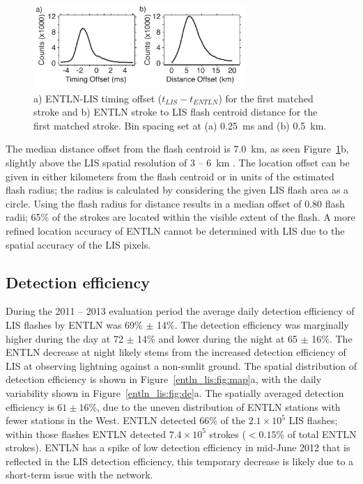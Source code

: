 \begin{figure}[t]
   \centering
   \noindent\includegraphics[width=19pc,angle=0]{entln_lis/Figures/accuracy.pdf}
   \caption{a) ENTLN-LIS timing offset ($t_{LIS} - t_{ENTLN}$) for the first matched stroke and
   		b) ENTLN stroke to LIS flash centroid distance for the first matched stroke.
   		Bin spacing set at (a) 0.25~ms and (b) 0.5~km.}
   \label{entln_lis:fig:accuracy}
\end{figure}

The median distance offset from the flash centroid is 7.0~km, as seen Figure~\ref{entln_lis:fig:accuracy}b, slightly above the LIS spatial resolution of 3 -- 6~km \citep{Christian1999}.
The location offset can be given in either kilometers from the flash centroid or in units of the estimated flash radius; the radius is calculated by considering the given LIS flash area as a circle.
Using the flash radius for distance results in a median offset of 0.80 flash radii; 65\% of the strokes are located within the visible extent of the flash.
A more refined location accuracy of ENTLN cannot be determined with LIS due to the spatial accuracy of the LIS pixels.

\subsection{Detection efficiency}

During the 2011 -- 2013 evaluation period the average daily detection efficiency of LIS flashes by ENTLN was 69\% $\pm$ 14\%.
The detection efficiency was marginally higher during the day at 72 $\pm$ 14\% and lower during the night at 65 $\pm$ 16\%.
The ENTLN decrease at night likely stems from the increased detection efficiency of LIS at observing lightning against a non-sunlit ground.
The spatial distribution of detection efficiency is shown in Figure~\ref{entln_lis:fig:map}a, with the daily variability shown in Figure~\ref{entln_lis:fig:de}a.
The spatially averaged detection efficiency is $61 \pm 16$\%, due to the uneven distribution of ENTLN stations with fewer stations in the West.
ENTLN detected 66\% of the $2.1\times10^5$ LIS flashes; within those flashes ENTLN detected $7.4\times10^5$ strokes ($<0.15$\% of total ENTLN strokes).
ENTLN has a spike of low detection efficiency in mid-June 2012 that is reflected in the LIS detection efficiency, this temporary decrease is likely due to a short-term issue with the network.

